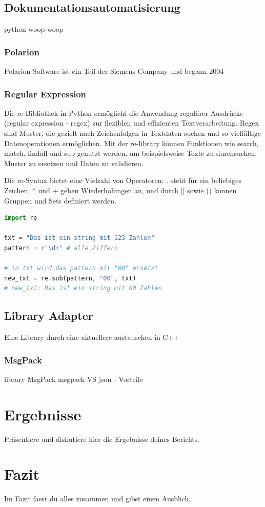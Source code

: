 \documentclass[a4paper, 12pt]{article}
\begin{document}
\subsection{Dokumentationsautomatisierung}\label{Dokumentationsautomatisierung}
python woop woop

\subsubsection{Polarion}\label{polarion}
Polarion Software ist ein Teil der Siemens Company und begann 2004

\subsubsection{Regular Expression}\label{regularExpression}
Die re-Bibliothek in Python ermöglicht die Anwendung regulärer Ausdrücke (regular expression - regex) zur flexiblen und effizienten Textverarbeitung. Regex sind Muster, die gezielt nach Zeichenfolgen in Textdaten suchen und so vielfältige Datenoperationen ermöglichen. Mit der re-library können Funktionen wie search, match, findall und sub genutzt werden, um beispielsweise Texte zu durchsuchen, Muster zu ersetzen und Daten zu validieren.

Die re-Syntax bietet eine Vielzahl von Operatoren: . steht für ein beliebiges Zeichen, * und + geben Wiederholungen an, und durch [] sowie () können Gruppen und Sets definiert werden.

\begin{lstlisting}[language=Python, caption=Beispiel für Python-Code]
import re

txt = "Das ist ein string mit 123 Zahlen"
pattern = r"\d+" # alle Ziffern

# in txt wird das pattern mit "00" ersetzt
new_txt = re.sub(pattern, "00", txt)
# new_txt: Das ist ein string mit 00 Zahlen
\end{lstlisting} %

\subsection{Library Adapter}\label{LibraryAdapter}
Eine Library durch eine aktuellere austauschen in C++

\subsubsection{MsgPack}\label{msgpack}
library MsgPack
msgpack VS json - Vorteile

\newpage
\section{Ergebnisse}
Präsentiere und diskutiere hier die Ergebnisse deines Berichts.

\newpage
\section{Fazit}
Im Fazit fasst du alles zusammen und gibst einen Ausblick.

\newpage

\end{document}
